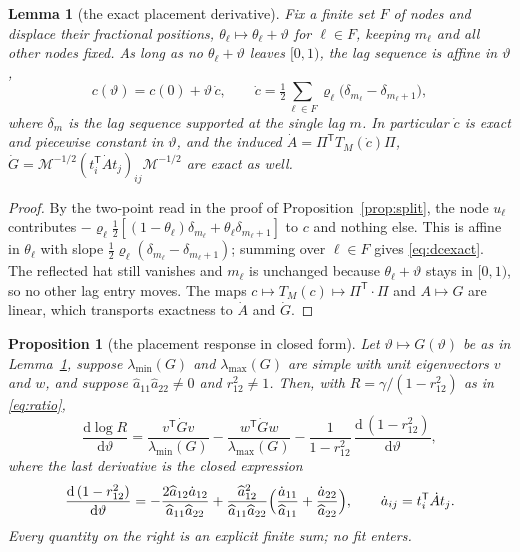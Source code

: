 \documentclass[11pt,a4paper]{article}
\theoremstyle{plain}
\newtheorem{proposition}[theorem]{Proposition}
\newtheorem{lemma}[theorem]{Lemma}
\theoremstyle{definition}
\newcommand{\T}{\mathsf{T}}
\newcommand{\Tm}[1]{T_{#1}}
\newcommand{\lmin}{\lambda_{\min}}
\newcommand{\lmax}{\lambda_{\max}}
\newcommand{\ah}{\widehat{a}}
\newcommand{\MM}{\mathcal{M}}
\begin{document}
\begin{lemma}[the exact placement derivative]
\label{lem:dcexact}
Fix a finite set $F$ of nodes and displace their fractional positions,
$\theta_\ell\mapsto\theta_\ell+\vartheta$ for $\ell\in F$, keeping $m_\ell$ and
all other nodes fixed. As long as no $\theta_\ell+\vartheta$ leaves $[0,1)$, the
lag sequence is affine in $\vartheta$,
\begin{equation}
\label{eq:dcexact}
  c(\vartheta)=c(0)+\vartheta\,\dot c,
  \qquad
  \dot c=\tfrac12\sum_{\ell\in F}\varrho_\ell
  \bigl(\delta_{m_\ell}-\delta_{m_\ell+1}\bigr),
\end{equation}
where $\delta_m$ is the lag sequence supported at the single lag $m$. In
particular $\dot c$ is exact and piecewise constant in $\vartheta$, and the
induced $\dot A=\Pi^{\T}\Tm{M}(\dot c)\Pi$, $\dot G=\MM^{-1/2}
(t_i^{\T}\dot At_j)_{ij}\MM^{-1/2}$ are exact as well.
\end{lemma}

\begin{proof}
By the two-point read in the proof of Proposition~\ref{prop:split}, the node
$u_\ell$ contributes $-\varrho_\ell\tfrac12[(1-\theta_\ell)\delta_{m_\ell}
+\theta_\ell\delta_{m_\ell+1}]$ to $c$ and nothing else. This is affine in
$\theta_\ell$ with slope
$\tfrac12\varrho_\ell(\delta_{m_\ell}-\delta_{m_\ell+1})$; summing over
$\ell\in F$ gives \eqref{eq:dcexact}. The reflected hat still vanishes and
$m_\ell$ is unchanged because $\theta_\ell+\vartheta$ stays in $[0,1)$, so no
other lag entry moves. The maps $c\mapsto\Tm{M}(c)\mapsto\Pi^{\T}\cdot\Pi$ and
$A\mapsto G$ are linear, which transports exactness to $\dot A$ and $\dot G$.
\end{proof}

\begin{proposition}[the placement response in closed form]
\label{prop:fh}
Let $\vartheta\mapsto G(\vartheta)$ be as in Lemma~\ref{lem:dcexact}, suppose
$\lmin(G)$ and $\lmax(G)$ are simple with unit eigenvectors $v$ and $w$, and
suppose $\ah_{11}\ah_{22}\ne0$ and $r_{12}^{2}\ne1$. Then, with
$R=\gamma/(1-r_{12}^{2})$ as in \eqref{eq:ratio},
\begin{equation}
\label{eq:fh}
  \frac{\mathrm d\log R}{\mathrm d\vartheta}
  =\frac{v^{\T}\dot Gv}{\lmin(G)}-\frac{w^{\T}\dot Gw}{\lmax(G)}
   -\frac{1}{1-r_{12}^{2}}\,
    \frac{\mathrm d\,(1-r_{12}^{2})}{\mathrm d\vartheta},
\end{equation}
where the last derivative is the closed expression
\begin{equation}
\label{eq:ddel}
  \frac{\mathrm d\,(1-r_{12}^{2})}{\mathrm d\vartheta}
  =-\frac{2\ah_{12}\dot a_{12}}{\ah_{11}\ah_{22}}
   +\frac{\ah_{12}^{2}}{\ah_{11}\ah_{22}}
    \Bigl(\frac{\dot a_{11}}{\ah_{11}}+\frac{\dot a_{22}}{\ah_{22}}\Bigr),
  \qquad \dot a_{ij}=t_i^{\T}\dot At_j .
\end{equation}
Every quantity on the right is an explicit finite sum; no fit enters.
\end{proposition}
\end{document}
